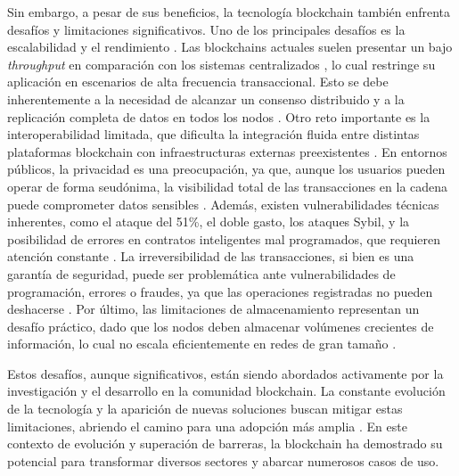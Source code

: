 Sin embargo, a pesar de sus beneficios, la tecnología blockchain también enfrenta desafíos y limitaciones significativos. Uno de los principales desafíos es la escalabilidad y el rendimiento \cite{tripathi2023comprehensive}. Las blockchains actuales suelen presentar un bajo \textit{throughput} en comparación con los sistemas centralizados \cite{baralla2023waste}, lo cual restringe su aplicación en escenarios de alta frecuencia transaccional. Esto se debe inherentemente a la necesidad de alcanzar un consenso distribuido y a la replicación completa de datos en todos los nodos \cite{tripathi2023comprehensive}. Otro reto importante es la interoperabilidad limitada, que dificulta la integración fluida entre distintas plataformas blockchain con infraestructuras externas preexistentes \cite{tripathi2023comprehensive}. En entornos públicos, la privacidad es una preocupación, ya que, aunque los usuarios pueden operar de forma seudónima, la visibilidad total de las transacciones en la cadena puede comprometer datos sensibles \cite{diez2023web, rennock2018blockchain}. Además, existen vulnerabilidades técnicas inherentes, como el ataque del 51\%, el doble gasto, los ataques Sybil, y la posibilidad de errores en contratos inteligentes mal programados, que requieren atención constante \cite{diez2023web}. La irreversibilidad de las transacciones, si bien es una garantía de seguridad, puede ser problemática ante vulnerabilidades de programación, errores o fraudes, ya que las operaciones registradas no pueden deshacerse \cite{taherdoost2023smart}. Por último, las limitaciones de almacenamiento representan un desafío práctico, dado que los nodos deben almacenar volúmenes crecientes de información, lo cual no escala eficientemente en redes de gran tamaño \cite{taherdoost2023smart}.

Estos desafíos, aunque significativos, están siendo abordados activamente por la investigación y el desarrollo en la comunidad blockchain. La constante evolución de la tecnología y la aparición de nuevas soluciones buscan mitigar estas limitaciones, abriendo el camino para una adopción más amplia \cite{tripathi2023comprehensive, baralla2023waste, taherdoost2023smart}. En este contexto de evolución y superación de barreras, la blockchain ha demostrado su potencial para transformar diversos sectores y abarcar numerosos casos de uso.


